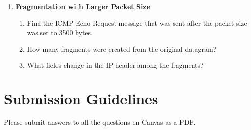 \documentclass[12pt]{article}
\begin{document}
\begin{enumerate}[label=Q\arabic*:]
    \item \textbf{Fragmentation with Larger Packet Size}
          \begin{enumerate}[label=(\alph*)]
              \item Find the ICMP Echo Request message that was sent after the packet size was set to 3500 bytes.
              \item How many fragments were created from the original datagram?
              \item What fields change in the IP header among the fragments?
          \end{enumerate}
\end{enumerate}

\section*{Submission Guidelines}
Please submit answers to all the questions on Canvas as a PDF.
\end{document}
